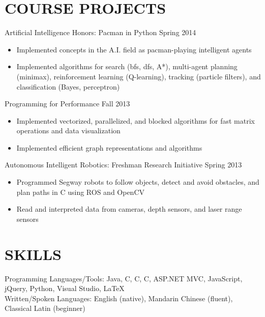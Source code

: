 \documentclass[margin]{res}
\newcommand{\PLUS}{\nolinebreak\hspace{-.05em}\raisebox{.4ex}{\tiny\bf+}}
\newcommand{\CC}{C\PLUS{}\PLUS{}}
\newcommand{\CS}{C\nolinebreak\hspace{-.05em}\raisebox{.4ex}{\scriptsize\bf \#}}
\begin{document}
\begin{resume}
\section{COURSE PROJECTS}

	Artificial Intelligence Honors: Pacman in Python \hfill Spring 2014
	\begin{itemize} \itemsep -2pt
	\item Implemented concepts in the A.I. field as pacman-playing intelligent agents
	\item Implemented algorithms for search (bfs, dfs, A*), multi-agent planning (minimax), reinforcement learning (Q-learning), tracking (particle filters), and classification (Bayes, perceptron)
	\end{itemize}

	Programming for Performance \hfill Fall 2013
	\begin{itemize} \itemsep -2pt
	\item Implemented vectorized, parallelized, and blocked algorithms for fast matrix operations and data visualization
	\item Implemented efficient graph representations and algorithms
	\end{itemize}

	Autonomous Intelligent Robotics: Freshman Research Initiative \hfill Spring 2013
	\begin{itemize} \itemsep -2pt
	\item Programmed Segway robots to follow objects, detect and avoid obstacles, and plan paths in \CC{} using ROS and OpenCV
	\item Read and interpreted data from cameras, depth sensors, and laser range sensors
	\end{itemize}

\section{SKILLS}
	Programming Languages/Tools: Java, C, \CC{}, \CS{}, ASP.NET MVC, JavaScript, jQuery, Python, Visual Studio, \LaTeX\\
	Written/Spoken Languages: English (native), Mandarin Chinese (fluent), Classical Latin (beginner)\\

\end{resume}
\end{document}
